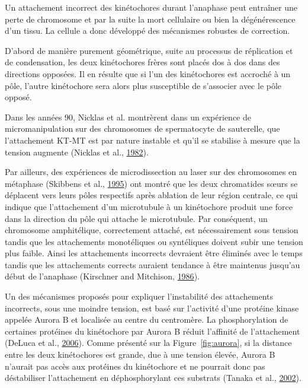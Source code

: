 \documentclass[12pt,a4paper,twoside,openright]{book}
\begin{document}
Un attachement incorrect des kinétochores durant l'anaphase peut
entraîner une perte de chromosome et par la suite la mort cellulaire ou
bien la dégénérescence d'un tissu. La cellule a donc développé des
mécanismes robustes de correction.

D'abord de manière purement géométrique, suite au processus de
réplication et de condensation, les deux kinétochores frères sont placés
dos à dos dans des directions opposées. Il en résulte que si l'un des
kinétochores est accroché à un pôle, l'autre kinétochore sera alors plus
susceptible de s'associer avec le pôle opposé.

Dans les années 90, Nicklas et al. montrèrent dans un expérience de
micromanipulation sur des chromosomes de spermatocyte de sauterelle, que
l'attachement KT-MT est par nature instable et qu'il se stabilise à
mesure que la tension augmente (Nicklas et al.,
\protect\hyperlink{ref-Nicklas1982}{1982}).

Par ailleurs, des expériences de microdissection au laser sur des
chromosomes en métaphase (Skibbens et al.,
\protect\hyperlink{ref-Skibbens1995}{1995}) ont montré que les deux
chromatides sœurs se déplacent vers leurs pôles respectifs après
ablation de leur région centrale, ce qui indique que l'attachement d'un
microtubule à un kinétochore produit une force dans la direction du pôle
qui attache le microtubule. Par conséquent, un chromosome amphitélique,
correctement attaché, est nécessairement sous tension tandis que les
attachements monotéliques ou syntéliques doivent subir une tension plus
faible. Ainsi les attachements incorrects devraient être éliminés avec
le temps tandis que les attachements corrects auraient tendance à être
maintenus jusqu'au début de l'anaphase (Kirschner and Mitchison,
\protect\hyperlink{ref-Kirschner1986}{1986}).

Un des mécanismes proposés pour expliquer l'instabilité des attachements
incorrects, sous une moindre tension, est basé sur l'activité d'une
protéine kinase appelée Aurora B et localisée au centre du centromère.
La phosphorylation de certaines protéines du kinétochore par Aurora B
réduit l'affinité de l'attachement (DeLuca et al.,
\protect\hyperlink{ref-DeLuca2006}{2006}). Comme présenté sur la
Figure~\ref{fig:aurora}, si la distance entre les deux kinétochores est
grande, due à une tension élevée, Aurora B n'aurait pas accès aux
protéines du kinétochore et ne pourrait donc pas déstabiliser
l'attachement en déphosphorylant ces substrats (Tanaka et al.,
\protect\hyperlink{ref-Tanaka2002}{2002}).
\end{document}
